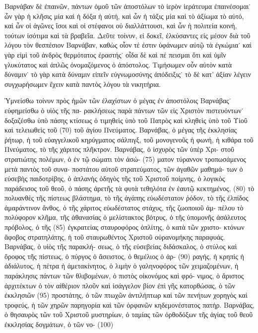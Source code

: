 Βαρνάβαν δὲ ἐπαινῶν, πάντων ὁμοῦ τῶν ἀποστόλων
τὸ ἱερὸν ἱεράτευμα ἐπαινέσομαι˙ ὧν γὰρ ἡ κλῆσις μία
καὶ ἡ δόξα ἡ αὐτή, καὶ ὧν ἡ τάξις μία καὶ τὸ ἀξίωμα
τὸ αὐτό, καὶ ὧν οἱ ἀγῶνες ἴσοι καὶ οἱ στέφανοι οὐ
διαλλάττουσι, καὶ ὧν ἡ πολιτεία κοινή, τούτων ἰσότιμα
καὶ τὰ βραβεῖα. Δεῦτε τοίνυν, εἰ δοκεῖ, ἑλκύσαντες εἰς
μέσον διὰ τοῦ λόγου τὸν θεσπέσιον Βαρνάβαν, καθὼς
οἷον τέ ἐστιν ὑφάνωμεν αὐτῷ τὰ ἐγκώμια˙ καὶ γὰρ
εἰμὶ τοῦ ἀνδρὸς θερμότατος ἐραστής˙ οἶδα δὲ καὶ πέ%
πεισμαι ὅτι καὶ ὑμῖν γλυκύτατος καὶ ἁπλῶς ὀνομαζόμενος
ὁ ἀπόστολος. Τιμήσωμεν οὖν αὐτὸν κατὰ δύναμιν˙ τὸ
γὰρ κατὰ δύναμιν εἰπεῖν εὐγνωμοσύνης ἀπόδειξις˙ τὸ
δὲ κατ’ ἀξίαν λέγειν συγχωρήσωμεν ἔχειν κατὰ παντὸς
λόγου τὰ νικητήρια.

\saut

  Ὑμνείσθω τοίνυν πρὸς ἡμῶν τῶν ἐλαχίστων ὁ μέγας
ἐν ἀποστόλοις Βαρνάβας˙ εὐφημείσθω ὁ υἱὸς τῆς πα-
ρακλήσεως παρὰ πάντων τῶν εἰς Χριστὸν πιστευόντων˙
δοξαζέσθω ὑπὸ πάσης κτίσεως ὁ τιμηθεὶς ὑπὸ τοῦ
Πατρὸς καὶ κληθεὶς ὑπὸ τοῦ Υἱοῦ καὶ τελειωθεὶς τοῦ (70)
τοῦ ἁγίου Πνεύματος. Βαρνάβας, ὁ μέγας τῆς ἐκκλησίας
ῥήτωρ, ἡ τοῦ εὐαγγελικοῦ κηρύγματος σάλπιγξ, τοῦ
μονογενοῦς ἡ φωνή, ἡ κιθάρα τοῦ Πνεύματος, τὸ τῆς
χάριτος πλῆκτρον. Βαρνάβας, ὁ ἰσχυρὸς τῶν ὑπὲρ Χρι-
στοῦ στρατιώτης πολέμων, ὁ ἐν τῷ σώματι τὸν ἀσώ- (75)
ματον τύραννον τροπωσάμενος μετὰ παντὸς τοῦ συνα-
ποστάτου αὐτοῦ στρατεύματος, τῶν ἀγαθῶν μαθημά-
των ὁ εὐσεβὴς παιδοτρίβης, ὁ ἀπλανὴς ὁδηγὸς τῆς
τοῦ Χριστοῦ ποίμνης, ὁ λογικὸς παράδεισος τοῦ θεοῦ,
ὁ πάσης ἀρετῆς τὰ φυτὰ τεθηλότα ἐν ἑαυτῷ κεκτημένος, (80)
τὸ πολυανθὲς τῆς πίστεως βλάστημα, τὸ τῆς ἀγάπης
εὐωδέστατον ῥόδον, τὸ τῆς ἐλπίδος ἀμαράντινον ἄνθος,
ὁ τῆς χάριτος εὐωδέστατος στάχυς, τῆς ζωοποιοῦ ἀμ-
πέλου τὸ πολύφορον κλῆμα, τῆς ἀθανασίας ὁ μελίστακτος
βότρυς, ὁ τῆς ὑπομονῆς ἀσάλευτος πρόβολος, ὁ τῆς (85)
ἐγκρατείας σταυροφόρος ὁπλίτης, ὁ κατὰ τῶν χριστο-
κτόνων ἄφοβος στρατηλάτης, ἡ τοῦ σταυρωθέντος Χριστοῦ
οὐρανομήκης παραφυάς. Βαρνάβας, ὁ υἱὸς τῆς παρακλή-
σεως, ὁ τῆς εὐσεβείας διδάσκαλος, ὁ στύλος καὶ ὄροφος
τῆς πίστεως, ὁ πύργος ὁ ἄσειστος, ὁ θεμέλιος ὁ ἀρ- (90)
ραγής, ἡ κρηπὶς ἡ ἀδιάλυτος, ἡ πέτρα ἡ ἀμετακίνητος,
ὁ λιμὴν ὁ γαληνοφόρος τῶν χειμαζομένων, ἡ παράκλησις
πάντων τῶν θλιβομένων, ὁ πιστὸς οἰκονόμος καὶ φρό-
νιμος, ὁ ἄριστος ἀρχιτέκτων ὁ τὸν αἰθέριον πλοῦν καὶ
ἰσάγγελον βίον ἐπὶ γῆς κατορθώσας, ὁ τῶν ἐκκλησιῶν (95)
προστάτης, ὁ τῶν πτωχῶν ἀντιλήπτωρ καὶ τῶν πενήτων
χορηγὸς καὶ τροφεύς, ἡ τῶν χηρῶν παρηγορία καὶ τῶν
ὀρφανῶν κηδεμονέστατος πατήρ. Βαρνάβας, ὁ θησαυρὸς
τῶν τοῦ Χριστοῦ μυστηρίων, ὁ ταμίας τῶν ὀρθοδόξων
τῆς ἁγίας τοῦ θεοῦ ἐκκλησίας δογμάτων, ὁ τῶν νο- (100)
